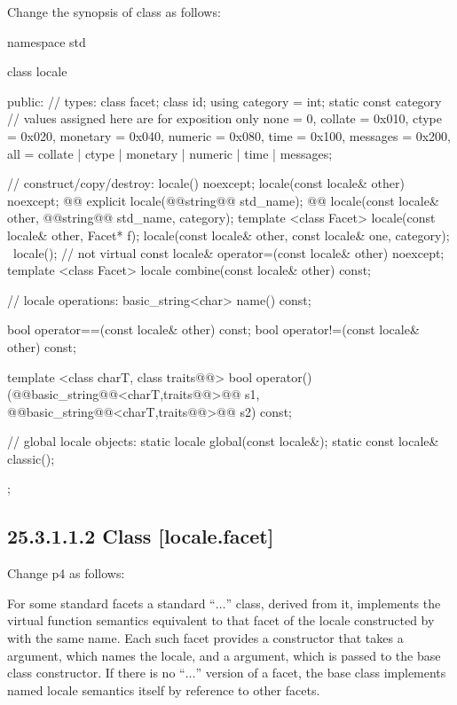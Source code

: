 \documentclass[ebook,11pt,article]{memoir}
\begin{document}
Change the synopsis of class  as follows:
\begin{codeblock}
namespace std {
  class locale {
  public:
    // types:
    class facet;
    class id;
    using category = int;
    static const category   // values assigned here are for exposition only
      none     = 0,
      collate  = 0x010, ctype    = 0x020,
      monetary = 0x040, numeric  = 0x080,
      time     = 0x100, messages = 0x200,
      all = collate | ctype | monetary | numeric | time  | messages;

    // construct/copy/destroy:
    locale() noexcept;
    locale(const locale& other) noexcept;
    @@
    explicit locale(@@string@\removed{\&}@ std_name);
    @@
    locale(const locale& other, @@string@\removed{\&}@ std_name, category);
    template <class Facet> locale(const locale& other, Facet* f);
    locale(const locale& other, const locale& one, category);
    ~locale();                  // not virtual
    const locale& operator=(const locale& other) noexcept;
    template <class Facet> locale combine(const locale& other) const;

    // locale operations:
    basic_string<char>                  name() const;

    bool operator==(const locale& other) const;
    bool operator!=(const locale& other) const;

    template <class charT, class traits@@>
      bool operator()(@@basic_string@@<charT,traits@@>@\removed{\&}@ s1,
                      @@basic_string@@<charT,traits@@>@\removed{\&}@ s2) const;

    // global locale objects:
    static       locale  global(const locale&);
    static const locale& classic();
  };
}
\end{codeblock}

\subsection{25.3.1.1.2 Class  [locale.facet]}
Change p4 as follows:

\pnum
For some standard facets a standard
``$\ldots$''
class, derived from it, implements the virtual function semantics
equivalent to that facet of the locale constructed by
with the same name.
Each such facet provides a constructor that takes a
argument, which names the locale, and a 
argument, which is passed to the base class constructor.
If there is no
``$\ldots$''
version of a facet, the base class implements named locale
semantics itself by reference to other facets.
\end{document}
